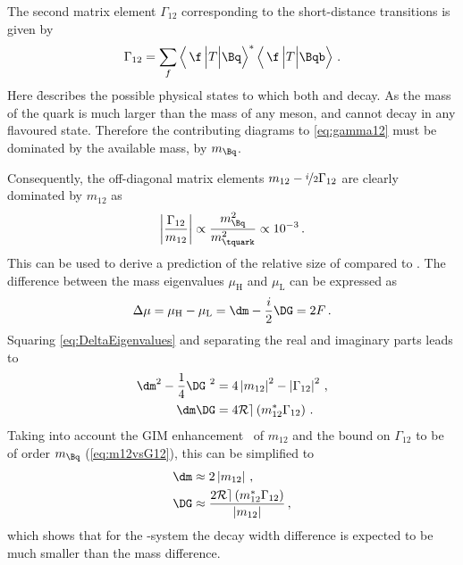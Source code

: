 The second matrix element $\Gamma_{12}$ corresponding to the short-distance transitions is given by
\begin{equation}
\Gamma_{12}=\sum_f\left<\,\f\,\Big|T\Big|\Bq\right>^\ast\left<\,\f\,\Big|T\Big|\Bqb\right>\,.\label{eq:gamma12}
\end{equation}
Here \f describes the possible physical states to which both \Bq and \Bqb decay.
As the mass of the \quark quark is much larger than the mass of any \B meson, \Bq and \Bqb cannot decay in any \tquark flavoured state.
Therefore the contributing diagrams to \cref{eq:gamma12} must be dominated by the available mass, \ie by $m_\Bq$.

Consequently, the off-diagonal matrix elements $m_{12}-\nicefrac{i}{2}\Gamma_{12}$ are clearly dominated by $m_{12}$ as
\begin{equation}
\left|\frac{\Gamma_{12}}{m_{12}}\right|\propto\frac{m_\Bq^2}{m_\tquark^2}\propto10^{-3}\,.\label{eq:m12vsG12}
\end{equation}
This can be used to derive a prediction of the relative size of \DG compared to \dm.
The difference between the mass eigenvalues $\mu_\text{H}$ and $\mu_\text{L}$ can be expressed as
\begin{equation}
\Delta\mu=\mu_\text{H}-\mu_\text{L}=\dm-\frac{i}{2}\DG=2F\,.\label{eq:DeltaEigenvalues}
\end{equation}
Squaring \cref{eq:DeltaEigenvalues} and separating the real and imaginary parts leads to
\begin{equation}
\begin{aligned}
\dm^2-\frac{1}{4}\DG^{\kern 3.4pt2}&=4\left|m_{12}\right|^2-\left|\Gamma_{12}\right|^2\,,\\
\dm\DG&=4\mathcal{Re}\left(m_{12}^\ast\Gamma_{12}\right)\,.
\end{aligned}
\end{equation}
Taking into account the GIM enhancement~\cite{PhysRevD.2.1285} of $m_{12}$ and the bound on $\Gamma_{12}$ to be of order $m_\Bq$ (\cref{eq:m12vsG12}), this can be simplified to
\begin{equation}
\begin{aligned}
\dm&\approx2\left|m_{12}\right|\,,\\
\DG&\approx\frac{2\mathcal{Re}\left(m_{12}^\ast\Gamma_{12}\right)}{\left|m_{12}\right|}\,,
\end{aligned}
\end{equation}
which shows that for the \Bz-system the decay width difference is expected to be much smaller than the mass difference.


